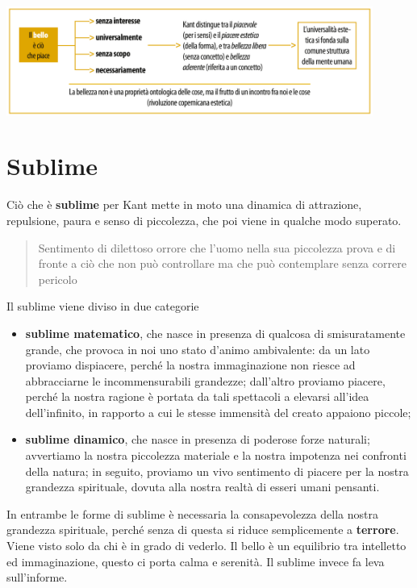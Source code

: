\documentclass[a4paper, twoside, titlepage]{book}
\newcommand{\citazione}[1]{%
  \begin{quotation}
  #1
  \end{quotation}}
\begin{document}
\begin{center}
\includegraphics[width=12cm]{1}
\end{center}

\section{Sublime}

Ciò che è \textbf{sublime} per Kant mette in moto una dinamica di attrazione, repulsione, paura e senso di piccolezza, che poi viene in qualche modo superato.

\citazione{Sentimento di dilettoso orrore che l'uomo nella sua piccolezza prova e di fronte a ciò che non può controllare ma che può contemplare senza correre pericolo}

Il sublime viene diviso in due categorie
\begin{itemize}
\item \textbf{sublime matematico}, che nasce in presenza di qualcosa di smisuratamente grande, che provoca in noi uno stato d'animo ambivalente: da un lato proviamo dispiacere, perché la nostra immaginazione non riesce ad abbracciarne le incommensurabili grandezze;  dall’altro proviamo piacere,  perché la nostra ragione è portata da tali spettacoli a elevarsi all’idea dell’infinito,  in rapporto a cui le stesse immensità del creato appaiono piccole;
\item \textbf{sublime dinamico}, che nasce in presenza di poderose forze naturali; avvertiamo la nostra  piccolezza  materiale  e la nostra  impotenza nei confronti della  natura; in seguito, proviamo un vivo sentimento di piacere per la nostra  grandezza spirituale,  dovuta alla nostra realtà di esseri umani pensanti.
\end{itemize}

In entrambe le forme di sublime è necessaria la consapevolezza della nostra grandezza spirituale, perché senza di questa si riduce semplicemente a \textbf{terrore}. Viene visto solo da chi è in grado di vederlo.
Il bello è un equilibrio tra intelletto ed immaginazione, questo ci porta calma e serenità.
Il sublime invece fa leva sull’informe.
\end{document}
